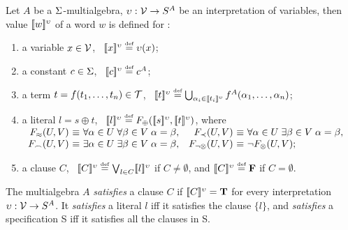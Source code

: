 %
%
 \begin{DEFINITION} \label {def:semanticsNG}
Let $A$ be a \(\Funcs\)-multialgebra, \(\upsilon:\Vars \to S^A\) be an
interpretation of variables, then value \(\Value w\) of a word $w$ is
defined for :
\begin{enumerate}%
\item a variable \(x\in\Vars\), \ \(\Value x \Def \upsilon(x)\);
  \label {semantics-v}
\item a constant $c\in\Funcs$, \ \(\Value c \Def c^A\);
\item a term \(t=f(\List tn,)\in \Terms\), \
  \(\Value t \Def \bigcup_{{\alpha_i} \in \Value{t_i}} f^A(\List{\alpha}n,)\);
  \label {semantics1}
\item a literal \(l=s\oplus t\), \ \(\Value l \Def
  F_\oplus(\Value s, \Value t)\), where
  \vspace{1ex}\newline \(
  \begin{array}{r@{\ \equiv\ } l@{\quad}r@{\ \equiv\ } l}
   F_{\Eq}(U,V)  & \forall \alpha\in U\; \forall \beta\in V\;\alpha=\beta, &
   F_{\Incl}(U,V)& \forall \alpha\in U\; \exists \beta\in V\;\alpha=\beta,\\
   F_{\Int}(U,V) & \exists \alpha\in U\; \exists \beta\in V\;\alpha=\beta, &
   F_{\neg\otimes}(U,V) & \neg F_\otimes(U,V);
  \end{array}\)
  \label {semantics3}
\item a clause \(C\), \ \(\Value C \Def 
  \bigvee_{l\in C} \Value{l} \) if \(C\neq \emptyset\), and \(\Value C \Def
  \false\) if $C=\emptyset$.
  \label {semantics4}
\end{enumerate}
\noindent
The multialgebra $A$ {\em satisfies} a clause $C$ if \(\Value C =
\true\) for every interpretation \(\upsilon:\Vars \to S^A\).
It {\em satisfies} a literal $l$ iff it satisfies the clause
\(\{ l\}\), and {\em satisfies} a specification \C S iff it satisfies all
the clauses in \C S.
\end{DEFINITION}


